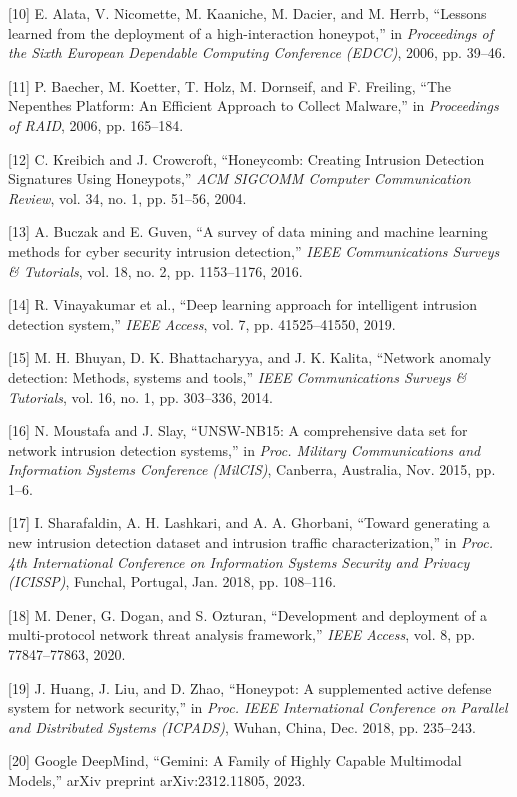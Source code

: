 \documentclass[12pt,a4paper]{report}
\begin{document}
[10] E. Alata, V. Nicomette, M. Kaaniche, M. Dacier, and M. Herrb, ``Lessons learned from the deployment of a high-interaction honeypot,'' in \textit{Proceedings of the Sixth European Dependable Computing Conference (EDCC)}, 2006, pp. 39--46.

[11] P. Baecher, M. Koetter, T. Holz, M. Dornseif, and F. Freiling, ``The Nepenthes Platform: An Efficient Approach to Collect Malware,'' in \textit{Proceedings of RAID}, 2006, pp. 165--184.

[12] C. Kreibich and J. Crowcroft, ``Honeycomb: Creating Intrusion Detection Signatures Using Honeypots,'' \textit{ACM SIGCOMM Computer Communication Review}, vol. 34, no. 1, pp. 51--56, 2004.

[13] A. Buczak and E. Guven, ``A survey of data mining and machine learning methods for cyber security intrusion detection,'' \textit{IEEE Communications Surveys \& Tutorials}, vol. 18, no. 2, pp. 1153--1176, 2016.

[14] R. Vinayakumar et al., ``Deep learning approach for intelligent intrusion detection system,'' \textit{IEEE Access}, vol. 7, pp. 41525--41550, 2019.

[15] M. H. Bhuyan, D. K. Bhattacharyya, and J. K. Kalita, ``Network anomaly detection: Methods, systems and tools,'' \textit{IEEE Communications Surveys \& Tutorials}, vol. 16, no. 1, pp. 303--336, 2014.

[16] N. Moustafa and J. Slay, ``UNSW-NB15: A comprehensive data set for network intrusion detection systems,'' in \textit{Proc. Military Communications and Information Systems Conference (MilCIS)}, Canberra, Australia, Nov. 2015, pp. 1--6.

[17] I. Sharafaldin, A. H. Lashkari, and A. A. Ghorbani, ``Toward generating a new intrusion detection dataset and intrusion traffic characterization,'' in \textit{Proc. 4th International Conference on Information Systems Security and Privacy (ICISSP)}, Funchal, Portugal, Jan. 2018, pp. 108--116.

[18] M. Dener, G. Dogan, and S. Ozturan, ``Development and deployment of a multi-protocol network threat analysis framework,'' \textit{IEEE Access}, vol. 8, pp. 77847--77863, 2020.

[19] J. Huang, J. Liu, and D. Zhao, ``Honeypot: A supplemented active defense system for network security,'' in \textit{Proc. IEEE International Conference on Parallel and Distributed Systems (ICPADS)}, Wuhan, China, Dec. 2018, pp. 235--243.

[20] Google DeepMind, ``Gemini: A Family of Highly Capable Multimodal Models,'' arXiv preprint arXiv:2312.11805, 2023.
\end{document}
